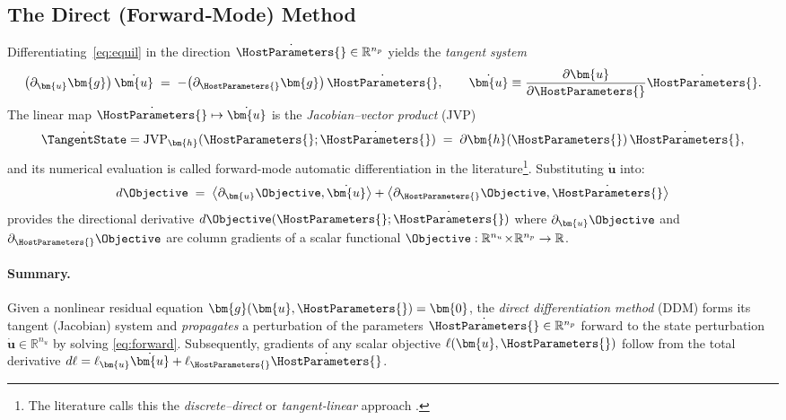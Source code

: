 \subsection{The Direct (Forward‐Mode) Method}  \label{sec:direct}


Differentiating~\eqref{eq:equil} in the direction
$\dot{\HostParameters{}}\in\mathbb{R}^{n_p}$ yields the \emph{tangent system}
%
\begin{equation}\label{eq:forward}
  \bigl(\partial_{\bm{u}}\bm{g}\bigr)\,\dot{\bm{u}}
  \;=\;-\bigl(\partial_{\HostParameters{}}\bm{g}\bigr)\,\dot{\HostParameters{}},
  \qquad
  \dot{\bm{u}}\equiv\dfrac{\partial \bm{u}}{\partial \HostParameters{}}\dot{\HostParameters{}}.
\end{equation}
%
The linear map
$\dot{\HostParameters{}}\mapsto\dot{\bm{u}}$ is the \emph{Jacobian–vector product} (JVP)
%
\[
 \dot{\TangentState} = \mathrm{JVP}_{\bm{h}}(\HostParameters{};\dot{\HostParameters{}})
  \;=\;
  \partial\bm{h}(\HostParameters{})\,\dot{\HostParameters{}},
\]
%
and its numerical evaluation is called forward-mode automatic
differentiation in the \autodiff{} literature\footnote{The \autodiff{} literature calls this the \emph{discrete–direct} or
\emph{tangent‐linear} approach \citep{barthelemy1995automatic}.}.  
Substituting $\dot{\bm{u}}$
into:
%
\[
  d\Objective
  \;=\;
  \bigl\langle\partial_{\bm{u}} \Objective,\dot{\bm{u}}\bigr\rangle
  +\bigl\langle\partial_{\HostParameters{}} \Objective,\dot{\HostParameters{}}\bigr\rangle
\]
%
provides the directional derivative $d \Objective(\HostParameters{};\dot{\HostParameters{}})$ where 
$\partial_{\bm{u}} \Objective$ and $\partial_{\HostParameters{}} \Objective$ are column gradients of a scalar
functional $\Objective :\mathbb{R}^{n_u}\!\times\!\mathbb{R}^{n_p}\to\mathbb{R}$.

\paragraph{Summary.}
Given a nonlinear residual equation $\bm{g}(\bm{u},\HostParameters{})=\bm{0}$, the \emph{direct differentiation
method} (DDM) forms its tangent (Jacobian) system and \emph{propagates} a
perturbation of the parameters
$\dot{\HostParameters{}}\in\mathbb{R}^{n_p}$ forward to the state perturbation
$\dot{\bm{u}}\in\mathbb{R}^{n_u}$ by solving \eqref{eq:forward}.
%
%
Subsequently, gradients of any scalar objective
$\ell(\bm{u},\HostParameters{})$ follow from the total derivative
$d \ell = \ell_{\bm{u}}\dot{\bm{u}} + \ell_{\HostParameters{}}\dot{\HostParameters{}}$.



